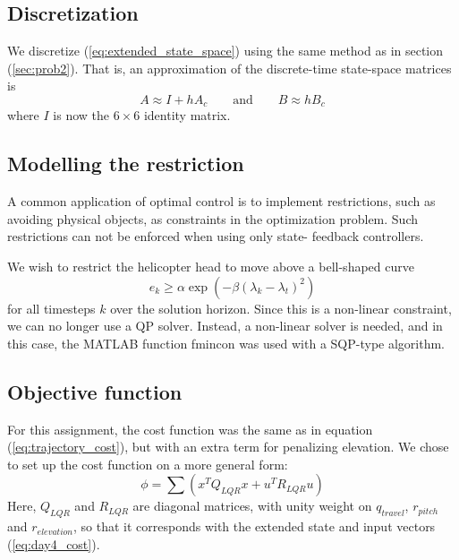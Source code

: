 \subsection{Discretization}
We discretize (\ref{eq:extended_state_space}) using the same method
as in section (\ref{sec:prob2}). That is, an approximation of the
discrete-time state-space matrices is
\begin{equation}
    A \approx I + hA_c
    \qquad\text{and}\qquad
    B \approx hB_c
\end{equation}
where $I$ is now the $6\times6$ identity matrix.

\subsection{Modelling the restriction}
A common application of optimal control is to implement restrictions,
such as avoiding physical objects, as constraints in the optimization
problem. Such restrictions can not be enforced when using only state-
feedback controllers.

We wish to restrict the helicopter head to move above a bell-shaped curve
\begin{equation}
    e_k \geq \alpha \exp (-\beta (\lambda_k - \lambda_t)^2 )
\end{equation}
for all timesteps $k$ over the solution horizon. Since this is a non-linear constraint, we can no longer use a QP solver. Instead, a non-linear solver is needed, and in this case, the MATLAB function fmincon was used with a SQP-type algorithm.


\subsection{Objective function}
For this assignment, the cost function was the same as in equation (\ref{eq:trajectory_cost}), but with an extra term for penalizing elevation. We chose to set up the cost function on a more general form:
\begin{equation}
    \phi=\sum(x^{T}Q_{LQR}x+u^{T}R_{LQR}u)
    \label{eq:day4_cost}
\end{equation}
Here, $Q_{LQR}$ and $R_{LQR}$ are diagonal matrices, with unity weight on $q_{travel}$, $r_{pitch}$ and $r_{elevation}$, so that it corresponds with the extended state and input vectors (\ref{eq:day4_cost}). %


